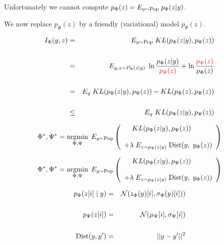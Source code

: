 {

Unfortunately we cannot compute {\color{red} $p_\Phi(z) = E_{y \sim \mathrm{Pop}}\;p_\Phi(z|y)$}.

\vfill
We now replace {\color{red} $p_\Phi(z)$} by a friendly (variational) model {\color{red} $p_\Psi(z)$}.

\begin{eqnarray*}
I_\Phi(y,z) & = & E_{y \sim \mathrm{Pop}}\; KL(p_\Phi(z|y),p_\Phi(z)) \\
\\
& = & E_{y,z\sim P_\Phi(z|y)}\; \ln \frac{p_\Phi(z|y)}{{\color{red} p_\Psi(z)}} + \ln \frac{{\color{red} p_\Psi(z)}}{p_\Phi(z)} \\
\\
& = & E_y\;KL(p_\Phi(z|y),p_\Psi(z)) - KL(p_\Phi(z),p_\Psi(z)) \\
\\
& \leq & E_y\;KL(p_\Phi(z|y),p_\Psi(z))
\end{eqnarray*}


{\color{red} $$\Phi^*,\Psi^* = \operatorname*{argmin}_{\Phi,\Psi}\;E_{y\sim \mathrm{Pop}} \left(\begin{array}{l}\;\;\;\;KL(p_\Phi(z|y),p_\Psi(z)) \\
\\
+ \lambda \; E_{z\sim p_\Phi(z|y)}\;\mathrm{Dist}(y,\;y_\Phi(z))\end{array}\right)$$}



$$\Phi^*,\Psi^* = \operatorname*{argmin}_{\Phi,\Psi}\;E_{y\sim \mathrm{Pop}} \left(\begin{array}{l}\;\;\;\;KL(p_\Phi(z|y),p_\Psi(z)) \\
\\
+ \lambda \; E_{z\sim p_\Phi(z|y)}\;\mathrm{Dist}(y,\;y_\Phi(z))\end{array}\right)$$

{\color{red}
\begin{eqnarray*}
p_\Phi(z[i]\;|\;y) & = & {\cal N}(z_\Phi(y)[i],\sigma_\Phi(y)[i])) \\
\\
p_\Psi(z[i]) & = & {\cal N}(\mu_\Psi[i],\sigma_\Psi[i]) \\
\\
\mathrm{Dist}(y,y') & = & ||y-y'||^2
\end{eqnarray*}
}


}
